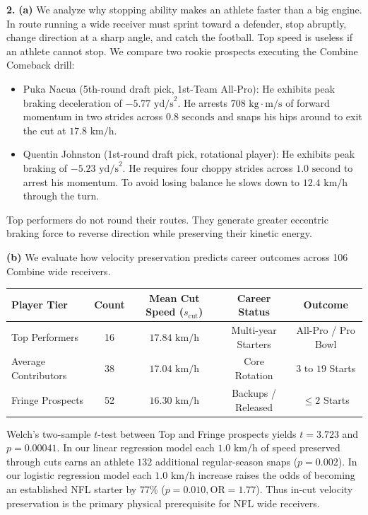 \documentclass[11pt]{article}
\begin{document}
\noindent\textbf{2.}
\noindent\textbf{(a)}
We analyze why stopping ability makes an athlete faster than a big engine. In route running a wide receiver must sprint toward a defender, stop abruptly, change direction at a sharp angle, and catch the football. Top speed is useless if an athlete cannot stop. We compare two rookie prospects executing the Combine Comeback drill:
\begin{itemize}[nosep]
    \item Puka Nacua (5th-round draft pick, 1st-Team All-Pro): He exhibits peak braking deceleration of $-5.77\text{ yd/s}^2$. He arrests $708\text{ kg}\cdot\text{m/s}$ of forward momentum in two strides across $0.8\text{ seconds}$ and snaps his hips around to exit the cut at $17.8\text{ km/h}$.
    \item Quentin Johnston (1st-round draft pick, rotational player): He exhibits peak braking of $-5.23\text{ yd/s}^2$. He requires four choppy strides across $1.0\text{ second}$ to arrest his momentum. To avoid losing balance he slows down to $12.4\text{ km/h}$ through the turn.
\end{itemize}
Top performers do not round their routes. They generate greater eccentric braking force to reverse direction while preserving their kinetic energy.

\noindent\textbf{(b)}
We evaluate how velocity preservation predicts career outcomes across 106 Combine wide receivers.

\begin{center}
\small
\setlength{\tabcolsep}{3.5pt}
\begin{tabular}{lcccc}
\toprule
\textbf{Player Tier} & \textbf{Count} & \textbf{Mean Cut Speed ($s_{\text{cut}}$)} & \textbf{Career Status} & \textbf{Outcome} \\
\midrule
Top Performers & 16 & $17.84\text{ km/h}$ & Multi-year Starters & All-Pro / Pro Bowl \\
Average Contributors & 38 & $17.04\text{ km/h}$ & Core Rotation & $3\text{ to }19$ Starts \\
Fringe Prospects & 52 & $16.30\text{ km/h}$ & Backups / Released & $\le 2$ Starts \\
\bottomrule
\end{tabular}
\end{center}

Welch's two-sample $t$-test between Top and Fringe prospects yields $t = 3.723$ and $p = 0.00041$. In our linear regression model each $1.0\text{ km/h}$ of speed preserved through cuts earns an athlete $132$ additional regular-season snaps ($p = 0.002$). In our logistic regression model each $1.0\text{ km/h}$ increase raises the odds of becoming an established NFL starter by 77\% ($p = 0.010, \text{OR} = 1.77$). Thus in-cut velocity preservation is the primary physical prerequisite for NFL wide receivers.
\end{document}
